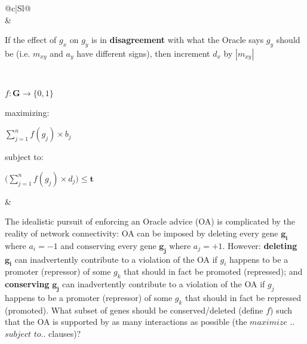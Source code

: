 \begin{table}[H]
{\begin{tabular}{ @{}c|Sl@{}}
				\\[-0.1cm] \hline
							&
							\parbox[t]{.7\textwidth}{\raggedright If the effect of  $g_x$   on   $g_y$  is in \textbf{disagreement} with what the Oracle
							says   $g_y$   should be (i.e.  $m_{xy}$   and
							$a_y$  have different signs), then increment   $d_x$ by $|m_{xy}|$}
				\\[-0.1cm] \hline
					\parbox[t]{.2\textwidth}{\centering
								$ f:\boldsymbol{G}  \rightarrow \{0,1\}$   %

								maximizing:

								$\sum\limits_{j=1}^{n} f(g_j)\times b_j$ %

								subject to:

								$\Bigg(  \sum\limits_{j=1}^{n} f(g_j)\times d_j  \Bigg)  \leq \boldsymbol{t}$
						}
						&
						\parbox[t]{.72\textwidth}{\raggedright %
							The idealistic pursuit of enforcing an Oracle advice (OA) is complicated by the reality of network connectivity:\newline
							OA can be imposed by deleting every gene $\boldsymbol{g_i}$ where $a_i = -1$  and conserving every gene $\boldsymbol{g_j}$
							where $a_j = +1$. However: \textbf{deleting} $\boldsymbol{g_i}$ can inadvertently contribute to a violation of the OA if $g_i$
							happens to be a promoter (repressor) of some $g_k$ that should in fact be promoted  (repressed); and \textbf{conserving} $\boldsymbol{g_j}$
							can inadvertently contribute to a violation of the OA if $g_j$ happens to be a promoter (repressor) of some $g_k$ that should in fact be
							repressed (promoted). What subset of genes should be conserved/deleted (define $f$) such that the OA is supported by as many interactions
							as possible (the $maximize$ .. $subject$ $to$.. clauses)? }
					\\[.01cm] \hline


			\end{tabular}
            }%
        \caption{ The syntax (left column) and semantics (right) of the network evolution problem (NEP)}
        \label{informal_table}
        \end{table}

\printbibliography

